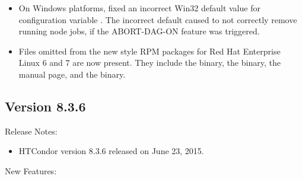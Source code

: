 \begin{itemize}
\item On Windows platforms, fixed an incorrect Win32 default value for
configuration variable .
The incorrect default caused 
to not correctly remove running node jobs,
if the ABORT-DAG-ON feature was triggered.

\item Files omitted from the new style RPM packages 
for Red Hat Enterprise Linux 6 and 7 are now present.
They include
the  binary, the  binary,
the  manual page, 
and the  binary.

\end{itemize}

\subsection*{\label{sec:New-8-3-6}Version 8.3.6}

\noindent Release Notes:

\begin{itemize}

\item HTCondor version 8.3.6 released on June 23, 2015.

\end{itemize}


\noindent New Features:

